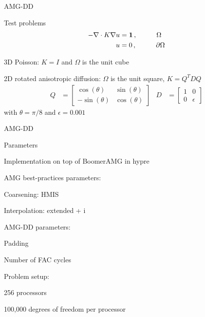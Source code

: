 \documentclass[18pt,xcolor=table]{beamer}
\begin{document}
\begin{frame}{AMG-DD}
\begin{block}{Test problems}
\begin{align*}
-\nabla \cdot K \nabla u &= \mathbf{1}\,, \hspace{1 cm} \Omega \\
u &= 0\,, \hspace{1 cm} \partial \Omega
\end{align*}
\bit
\item 3D Poisson: $K = I$ and $\Omega$ is the unit cube
\item 2D rotated anisotropic diffusion: $\Omega$ is the unit square, $K = Q^TDQ$
\eit
\begin{align*}
Q &= \begin{bmatrix}
\cos(\theta) & \sin(\theta) \\
-\sin(\theta) & \cos(\theta)
\end{bmatrix}
&
D &= \begin{bmatrix}
1 & 0\\
0 & \epsilon
\end{bmatrix}
\end{align*}
with $\theta=\pi/8$ and $\epsilon=0.001$
\end{block}
\end{frame}

\begin{frame}{AMG-DD}
\begin{block}{Parameters}
\bit
\item Implementation on top of BoomerAMG in hypre
\item AMG best-practices parameters:
\bit
   \item Coarsening: HMIS
   \item Interpolation: extended + i
\eit
\item AMG-DD parameters:
\bit
   \item Padding
   \item Number of FAC cycles
\eit
\item Problem setup:
\bit
   \item 256 processors
   \item 100,000 degrees of freedom per processor
\eit
\eit
\end{block}
\end{frame}
\end{document}
